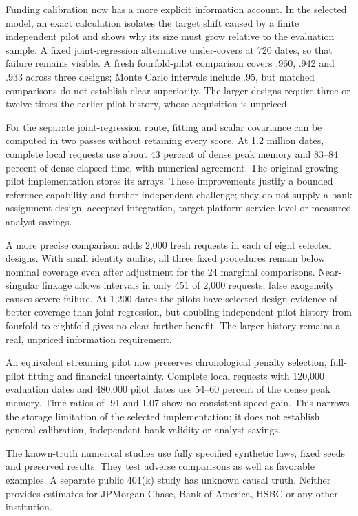 \documentclass[11pt,a4paper,openany]{book}
\begin{document}
Funding calibration now has a more explicit information account. In the
selected model, an exact calculation isolates the target shift caused by a
finite independent pilot and shows why its size must grow relative to the
evaluation sample. A fixed joint-regression alternative under-covers at 720
dates, so that failure remains visible. A fresh fourfold-pilot comparison
covers .960, .942 and .933 across three designs; Monte Carlo intervals include
.95, but matched comparisons do not establish clear superiority. The larger
designs require three or twelve times the earlier pilot history, whose
acquisition is unpriced.

For the separate joint-regression route, fitting and scalar covariance can be
computed in two passes without retaining every score. At 1.2 million dates,
complete local requests use about 43 percent of dense peak memory and
83--84 percent of dense elapsed time, with numerical agreement. The
original growing-pilot implementation stores its arrays. These improvements
justify a bounded reference capability and further independent challenge;
they do not supply a bank assignment design, accepted integration, target-platform
service level or measured analyst savings.

A more precise comparison adds 2,000 fresh requests in each of eight selected
designs. With small identity audits, all three fixed procedures remain below
nominal coverage even after adjustment for the 24 marginal comparisons.
Near-singular linkage allows intervals in only 451 of 2,000 requests; false
exogeneity causes severe failure. At 1,200 dates the pilots have selected-design
evidence of better coverage than joint regression, but doubling independent
pilot history from fourfold to eightfold gives no clear further benefit.
The larger history remains a real, unpriced information requirement.

An equivalent streaming pilot now preserves chronological penalty selection,
full-pilot fitting and financial uncertainty. Complete local requests with
120,000 evaluation dates and 480,000 pilot dates use 54--60 percent of the
dense peak memory. Time ratios of .91 and 1.07 show no consistent speed gain.
This narrows the storage limitation of the selected implementation; it does
not establish general calibration, independent bank validity or analyst savings.

The known-truth numerical studies use fully specified synthetic laws, fixed
seeds and preserved results. They test adverse comparisons as well as
favorable examples. A separate public 401(k) study has unknown causal truth.
Neither provides estimates for JPMorgan Chase, Bank of America, HSBC or
any other institution.
\end{document}
